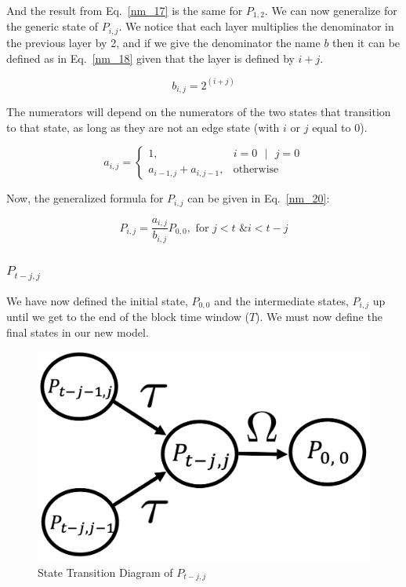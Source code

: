 \documentclass[conference]{IEEEtran}
\begin{document}
And the result from Eq.~\ref{nm_17} is the same for $P_{1,2}$. We can now generalize
for the generic state of $P_{i,j}$. We notice that each layer multiplies the denominator in 
the previous layer by 2, and if we give the denominator the name $b$ then it can be defined
as in Eq.~\ref{nm_18} given that the layer is defined by $i+j$. 

\begin{equation}
  b_{i,j} = 2^{(i+j)}\label{nm_18}
\end{equation}

The numerators will depend on the numerators of the two states that transition to that
state, as long as they are not an edge state (with $i$ or $j$ equal to 0). 

\begin{equation}
  a_{i,j} =
    \begin{cases}
      1,                            & i = 0 \text{ }|\text{ } j = 0 \\
      a_{i-1,j} + a_{i,j-1},  & \text{otherwise}
    \end{cases}
    \label{nm_19}
\end{equation}

Now, the generalized formula for $P_{i,j}$ can be given in Eq.~\ref{nm_20}:

\begin{equation}
  P_{i,j} = \frac{a_{i,j}}{b_{i,j}}P_{0,0}, \text{  for } j < t \text{ \& } i < t-j\label{nm_20}
\end{equation}

\subsubsection{$P_{t-j,j}$}

We have now defined the initial state, $P_{0,0}$ and the intermediate states, $P_{i,j}$ up 
until we get to the end of the block time window ($T$). We must now define the final states
in our new model. 

\begin{figure}[htbp]
    \centerline{\includegraphics[width=\linewidth]{Figures/P_t-j,j}}
    \caption{State Transition Diagram of $P_{t-j,j}$} 
    \label{P_t-j,j}
\end{figure}
\end{document}
